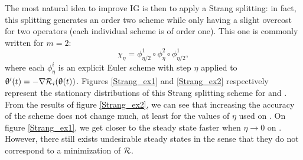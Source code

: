 \documentclass[article,authoryear,jmlmc]{beg_32}             %
\begin{document}
The most natural idea to improve IG is then to apply a Strang splitting: in fact, this splitting generates an order two scheme while only having a slight overcost for two operators
(each individual scheme is of order one). This one is commonly written for $m=2$:
\begin{equation*}
	\chi_{\eta} = \phi_{\eta/2}^1 \circ \phi_{\eta}^2 \circ \phi_{\eta/2}^1,
\end{equation*}
where each $\phi_{\eta}^i$ is an explicit Euler scheme with step $\eta$ applied to $\uptheta'(t) = -\nabla \mathcal{R}_i(\uptheta(t))$.
Figures \ref{Strang_ex1} and \ref{Strang_ex2} respectively represent the stationary distributions of this Strang splitting scheme for \exOne and \exTwo. From the results of figure
\ref{Strang_ex2}, we can see that increasing the accuracy of the scheme does not change much, at least for the values of $\eta$ used on \exTwo. On figure \ref{Strang_ex1}, we get closer to the steady state faster when $\eta \to 0$ on
\exOne. However, there still exists undesirable steady states in the sense that they do not correspond to a minimization of $\mathcal{R}$. 
\end{document}
